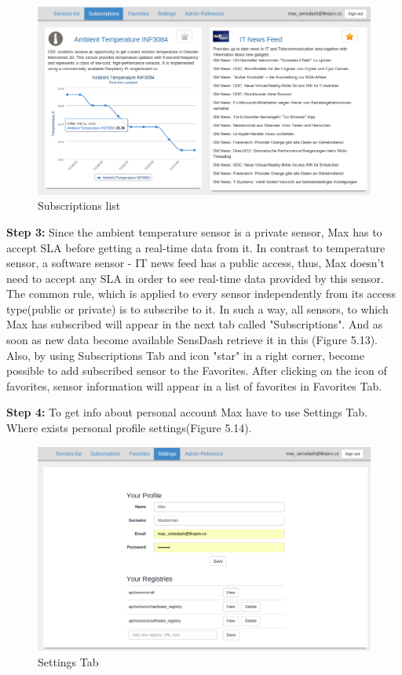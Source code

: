 \begin{figure}[!ht]
\centering
\includegraphics[scale=0.6]{Screenshots/UseCaseScreenshot4.png}   
\caption[Personal Subscribed Sensor]{Subscriptions list}                         
\end{figure}
\textbf{Step 3:} Since the ambient temperature sensor is a private sensor, Max has to accept SLA before getting a real-time data from it. In contrast to temperature sensor, a software sensor - IT news feed has a public access, thus, Max doesn't need to accept any SLA in order to see real-time data provided by this sensor. The common rule, which is applied to every sensor independently from its access type(public or private) is to subscribe to it. In such a way, all sensors, to which Max has subscribed will appear in the next tab called "Subscriptions". And as soon as new data become available SensDash retrieve it in this (Figure 5.13). Also, by using Subscriptions Tab and icon "star" in a right corner, become possible to add subscribed sensor to the Favorites. After clicking on the icon of favorites, sensor information will appear in a list of favorites in Favorites Tab.

\textbf{Step 4:} To get info about personal account Max have to use Settings Tab. Where exists personal profile settings(Figure 5.14). 
\begin{figure}[!ht]
\centering
\includegraphics[scale=0.6]{Screenshots/UseCaseScreenshot6.png}   
\caption[Settings Tab]{Settings Tab}                         
\end{figure}

